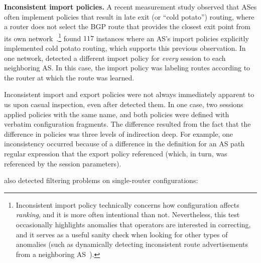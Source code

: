{\bf Inconsistent import policies.} A recent measurement study observed
that ASes often implement policies that result in late exit (or ``cold
potato'') routing, where a router does not select the BGP route that provides
the closest exit point from its own
network~\cite{Spring2003}.\footnote{Inconsistent import policy technically
  concerns how configuration affects {\em ranking}, and it is more
  often intentional than not.  Nevertheless, this test occasionally highlights
  anomalies that operators are interested in correcting, and it serves
  as a useful sanity check when looking for other types of anomalies (such as
  dynamically detecting inconsistent route advertisements from a
  neighboring AS~\cite{Feamster2004b}).}   \rcc 
found $117$ instances where an AS's import policies explicitly
implemented cold potato routing, which supports this previous
observation.  In one network, \rcc detected a different import policy
for {\em every} session to each neighboring AS. In this case, the import
policy was labeling routes according to the router at which the route
was learned. 

Inconsistent import and export policies were not always
immediately apparent to us upon casual inspection, even after \rcc
detected them. In one case, two 
sessions applied policies with the same name, and both policies were
defined with verbatim configuration fragments.  The difference
resulted from the fact that the difference in policies was three levels
of indirection deep.  For example, one inconsistency occurred because of
a difference in the definition for an AS path regular expression that
the export policy referenced (which, in turn, was referenced by the
session parameters).




\rcc also detected filtering problems on
single-router configurations:

